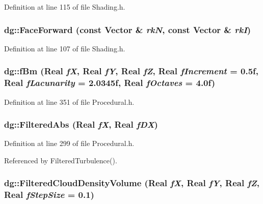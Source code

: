 Definition at line 115 of file Shading.h.
\subsubsection{ dg::Face\-Forward (const {\bf Vector} \& {\em rk\-N}, const {\bf Vector} \& {\em rk\-I})\hspace{0.3cm}{\tt  [inline]}}\label{namespacedg_a179}




Definition at line 107 of file Shading.h.
\subsubsection{ dg::f\-Bm ({\bf Real} {\em f\-X}, {\bf Real} {\em f\-Y}, {\bf Real} {\em f\-Z}, {\bf Real} {\em f\-Increment} = 0.5f, {\bf Real} {\em f\-Lacunarity} = 2.0345f, {\bf Real} {\em f\-Octaves} = 4.0f)\hspace{0.3cm}{\tt  [inline]}}\label{namespacedg_a144}




Definition at line 351 of file Procedural.h.
\subsubsection{ dg::Filtered\-Abs ({\bf Real} {\em f\-X}, {\bf Real} {\em f\-DX})\hspace{0.3cm}{\tt  [inline]}}\label{namespacedg_a160}




Definition at line 299 of file Procedural.h.

Referenced by Filtered\-Turbulence().
\subsubsection{ dg::Filtered\-Cloud\-Density\-Volume ({\bf Real} {\em f\-X}, {\bf Real} {\em f\-Y}, {\bf Real} {\em f\-Z}, {\bf Real} {\em f\-Step\-Size} = 0.1)\hspace{0.3cm}{\tt  [inline]}}\label{namespacedg_a202}




